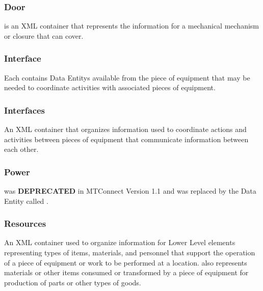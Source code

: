 \FloatBarrier

\subsubsection{Door}
  \label{sec:Door}



 is an XML container that represents the information for a mechanical mechanism or closure that can cover.

\FloatBarrier

\subsubsection{Interface}
  \label{sec:Interface}



Each  contains \glspl{Data Entity} available from the piece of equipment that may be needed to coordinate activities with associated pieces of equipment.

\FloatBarrier

\subsubsection{Interfaces}
  \label{sec:Interfaces}



An XML container that organizes information used to coordinate actions and activities between pieces of equipment that communicate information between each other.

\FloatBarrier

\subsubsection{Power}
  \label{sec:Power}



 was \textbf{DEPRECATED} in MTConnect Version 1.1 and was replaced by the \gls{Data Entity} called .

\FloatBarrier

\subsubsection{Resources}
  \label{sec:Resources}



An XML container used to organize information for \gls{Lower Level} elements representing types of items, materials, and personnel that support the operation of a piece of equipment or work to be performed at a location.  also represents materials or other items consumed or transformed by a piece of equipment for production of parts or other types of goods.

